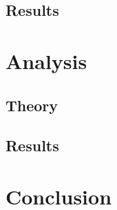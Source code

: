 \subsection{Results}


\section{Analysis}

\subsection{Theory}

\subsection{Results}


\section{Conclusion}